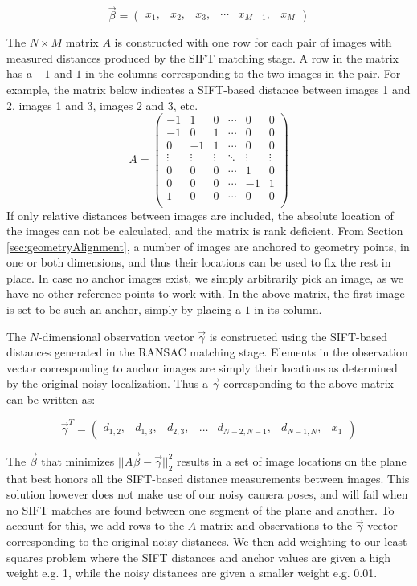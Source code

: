 \documentclass[]{spie}  %
\begin{document}
{\[\vec{\beta} =
\begin{pmatrix}
  x_1, & x_2, & x_3, & \cdots & x_{M-1}, & x_M
\end{pmatrix}
\]

The $N \times M$ matrix $A$ is constructed with one row for each pair
of images with measured distances produced by the SIFT matching
stage. A row in the matrix has a $-1$ and $1$ in the columns
corresponding to the two images in the pair. For example, the matrix
below indicates a SIFT-based distance between images 1 and 2, images 1
and 3, images 2 and 3, etc.
\[
A =
\begin{pmatrix}
  -1 & 1 & 0 & \cdots & 0 & 0\\
  -1 & 0 & 1 & \cdots & 0 & 0\\
  0 & -1 & 1 & \cdots & 0 & 0\\
  \vdots  & \vdots & \vdots & \ddots & \vdots  & \vdots\\
  0 & 0 & 0 & \cdots & 1 & 0 \\
  0 & 0 & 0 & \cdots & -1 & 1 \\
  1 & 0 & 0 & \cdots & 0 & 0\\
\end{pmatrix}
\]
If only relative distances between images are included, the absolute
location of the images can not be calculated, and the matrix is rank
deficient. From Section \ref{sec:geometryAlignment}, a number of
images are anchored to geometry points, in one or both dimensions, and
thus their locations can be used to fix the rest in place. In case no
anchor images exist, we simply arbitrarily pick an image, as we have
no other reference points to work with. In the above matrix, the first
image is set to be such an anchor, simply by placing a $1$ in its
column.

The $N$-dimensional observation vector $\vec{\gamma}$ is constructed
using the SIFT-based distances generated in the RANSAC matching
stage. Elements in the observation vector corresponding to anchor
images are simply their locations as determined by the original noisy
localization. Thus a $\vec{\gamma}$ corresponding to the above matrix
can be written as:

\[
\vec{\gamma}^T =
\begin{pmatrix}
  d_{1,2}, &d_{1,3}, &d_{2,3}, &\hdots &d_{N-2,N-1}, &d_{N-1,N}, &x_1
\end{pmatrix}
\]

The $\vec{\beta}$ that minimizes $||A \vec{\beta} -
\vec{\gamma}||_2^2$ results in a set of image locations on the plane
that best honors all the SIFT-based distance measurements between
images. This solution however does not make use of our noisy camera
poses, and will fail when no SIFT matches are found between one
segment of the plane and another. To account for this, we add rows to
the $A$ matrix and observations to the $\vec{\gamma}$ vector
corresponding to the original noisy distances. We then add weighting
to our least squares problem where the SIFT distances and anchor
values are given a high weight e.g. 1, while the noisy distances are
given a smaller weight e.g. 0.01.

}
\end{document}
